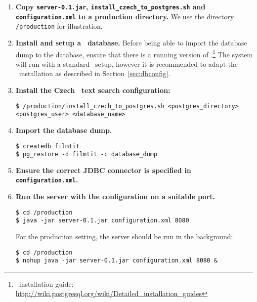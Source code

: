 \begin{enumerate}

\item \textbf{Copy {\tt server-0.1.jar}, {\tt install\_czech\_to\_postgres.sh} and {\tt configuration.xml} to a production directory.} We use the directory {\tt /production} for illustration.

\item \textbf{Install and setup a \postgres~database.} Before being able to import the database dump to the database, ensure that there is a running version of \postgres.\footnote{\postgres~installation guide: \url{http://wiki.postgresql.org/wiki/Detailed_installation_guides}} The system will run with a standard \postgres~setup, however it is recommended to adapt the \postgres~installation as described in Section~\ref{sec:dbconfig}.

\item \textbf{Install the Czech \postgres~text search configuration:}
\vspace*{0.5em}
\begin{lstlisting}
$ /production/install_czech_to_postgres.sh <postgres_directory> <postgres_user> <database_name>
\end{lstlisting}
\vspace*{0.5em}

\item \textbf{Import the database dump.}
\vspace*{0.5em}
\begin{lstlisting}
$ createdb filmtit
$ pg_restore -d filmtit -c database_dump
\end{lstlisting}
\vspace*{0.5em}

\item \textbf{Ensure the correct JDBC connector is specified in {\tt configuration.xml}.}
\item \textbf{Run the server with the configuration on a suitable port.} 
\vspace*{0.5em}
\begin{lstlisting}
$ cd /production
$ java -jar server-0.1.jar configuration.xml 8080
\end{lstlisting}
\vspace*{0.5em}

For the production setting, the server should be run in the background:
\vspace*{0.5em}
\begin{lstlisting}
$ cd /production
$ nohup java -jar server-0.1.jar configuration.xml 8080 &
\end{lstlisting}
\vspace*{0.5em}






\end{enumerate}




